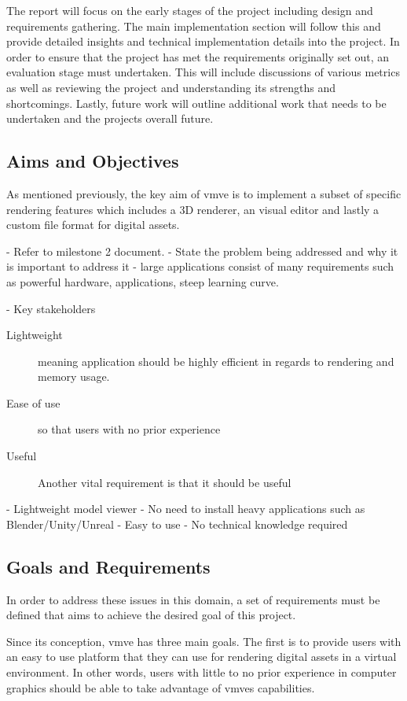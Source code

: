 \documentclass[11pt]{article}
\begin{document}
The report will focus on the early stages of the project including design and
requirements gathering. The main implementation section will follow this and
provide detailed insights and technical implementation details into the project.
In order to ensure that the project has met the requirements originally set out,
an evaluation stage must undertaken. This will include discussions of various
metrics as well as reviewing the project and understanding its strengths and
shortcomings. Lastly, future work will outline additional work that needs to be
undertaken and the projects overall future.

\subsection{Aims and Objectives}
As mentioned previously, the key aim of \gls{vmve} is to implement a subset of 
specific rendering features which includes a 3D renderer, an visual editor
and lastly a custom file format for digital assets.

- Refer to milestone 2 document.
- State the problem being
addressed and why it is important to address it - large applications
consist of many requirements such as powerful hardware, applications,
steep learning curve.

- Key stakeholders


\begin{description}
  \item[Lightweight] meaning application should be highly
    efficient in regards to rendering and memory usage.
  \item[Ease of use] so that users with no prior experience
  \item[Useful]
    Another vital requirement is that it should be useful
\end{description}
  
  - Lightweight model viewer - No need to install heavy
  applications such as Blender/Unity/Unreal - Easy to use - No technical
  knowledge required


\subsection{Goals and Requirements}
In order to address these issues in this domain, a set of requirements
must be defined that aims to achieve the desired goal of this project.

Since its conception, \gls{vmve} has three main goals. The first is to provide
users with an easy to use platform that they can use for rendering digital
assets in a virtual environment. In other words, users with little to no prior
experience in computer graphics should be able to take advantage of \glspl{vmve} 
capabilities.
\end{document}
